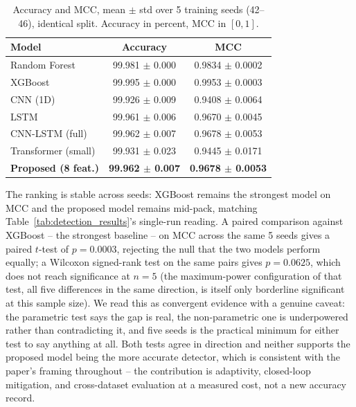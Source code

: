 \documentclass[ASNA,twocolumn]{USG} %
\begin{document}
\begin{table}[hbt!]
\centering
\caption{Accuracy and MCC, mean $\pm$ std over 5 training seeds (42--46), identical split. Accuracy in percent, MCC in $[0,1]$.}
\label{tab:detection_stats}
\renewcommand{\arraystretch}{1.2}
\begin{tabular}{|p{3.0cm}|c|c|}
\hline
\textbf{Model} & \textbf{Accuracy} & \textbf{MCC} \\
\hline
Random Forest & 99.981 $\pm$ 0.000 & 0.9834 $\pm$ 0.0002 \\ \hline
XGBoost & 99.995 $\pm$ 0.000 & 0.9953 $\pm$ 0.0003 \\ \hline
CNN (1D) & 99.926 $\pm$ 0.009 & 0.9408 $\pm$ 0.0064 \\ \hline
LSTM & 99.961 $\pm$ 0.006 & 0.9670 $\pm$ 0.0045 \\ \hline
CNN-LSTM (full) & 99.962 $\pm$ 0.007 & 0.9678 $\pm$ 0.0053 \\ \hline
Transformer (small) & 99.931 $\pm$ 0.023 & 0.9445 $\pm$ 0.0171 \\ \hline
\rowcolor{gray!20}
\textbf{Proposed (8 feat.)} & \textbf{99.962 $\pm$ 0.007} & \textbf{0.9678 $\pm$ 0.0053} \\ \hline
\end{tabular}
\end{table}

The ranking is stable across seeds: XGBoost remains the strongest model on MCC and the proposed model remains mid-pack, matching Table~\ref{tab:detection_results}'s single-run reading. A paired comparison against XGBoost -- the strongest baseline -- on MCC across the same 5 seeds gives a paired $t$-test of $p = 0.0003$, rejecting the null that the two models perform equally; a Wilcoxon signed-rank test on the same pairs gives $p = 0.0625$, which does not reach significance at $n=5$ (the maximum-power configuration of that test, all five differences in the same direction, is itself only borderline significant at this sample size). We read this as convergent evidence with a genuine caveat: the parametric test says the gap is real, the non-parametric one is underpowered rather than contradicting it, and five seeds is the practical minimum for either test to say anything at all. Both tests agree in direction and neither supports the proposed model being the more accurate detector, which is consistent with the paper's framing throughout -- the contribution is adaptivity, closed-loop mitigation, and cross-dataset evaluation at a measured cost, not a new accuracy record.
\end{document}
